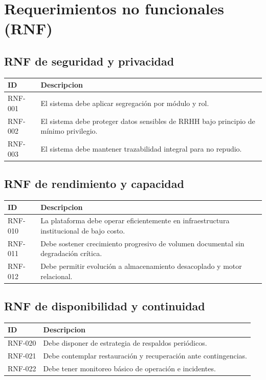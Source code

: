 \section{Requerimientos no funcionales (RNF)}
\subsection{RNF de seguridad y privacidad}
\begin{longtable}{p{} p{}}
\toprule
\textbf{ID} & \textbf{Descripcion} \\
\midrule
RNF-001 & El sistema debe aplicar segregación por módulo y rol. \\
RNF-002 & El sistema debe proteger datos sensibles de RRHH bajo principio de mínimo privilegio. \\
RNF-003 & El sistema debe mantener trazabilidad integral para no repudio. \\
\bottomrule
\end{longtable}

\subsection{RNF de rendimiento y capacidad}
\begin{longtable}{p{} p{}}
\toprule
\textbf{ID} & \textbf{Descripcion} \\
\midrule
RNF-010 & La plataforma debe operar eficientemente en infraestructura institucional de bajo costo. \\
RNF-011 & Debe sostener crecimiento progresivo de volumen documental sin degradación crítica. \\
RNF-012 & Debe permitir evolución a almacenamiento desacoplado y motor relacional. \\
\bottomrule
\end{longtable}

\subsection{RNF de disponibilidad y continuidad}
\begin{longtable}{p{} p{}}
\toprule
\textbf{ID} & \textbf{Descripcion} \\
\midrule
RNF-020 & Debe disponer de estrategia de respaldos periódicos. \\
RNF-021 & Debe contemplar restauración y recuperación ante contingencias. \\
RNF-022 & Debe tener monitoreo básico de operación e incidentes. \\
\bottomrule
\end{longtable}


